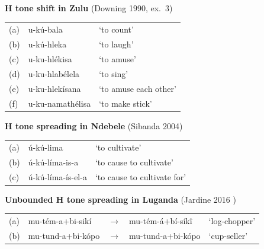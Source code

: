 \ex \textbf{H tone shift in Zulu} (Downing 1990, ex.~3)

\begin{tabular}{@{}lll@{}}
(a) & u-kú-bala            & `to count' \\
(b) & u-kú-hleka           & `to laugh' \\
(c) & u-ku-hlékisa         & `to amuse' \\
(d) & u-ku-hlabélela       & `to sing' \\
(e) & u-ku-hlekísana       & `to amuse each other' \\
(f) & u-ku-namathélisa     & `to make stick' \\[0.4em]
\end{tabular}
\xe

\ex \textbf{H tone spreading in Ndebele} (Sibanda 2004)

\begin{tabular}{@{}lll@{}}
	(a) & ú-kú-lima	& `to cultivate'	\\
	(b) & ú-kú-líma-is-a	           & `to cause to cultivate' \\
	(c) & ú-kú-líma-ís-el-a	           & `to cause to cultivate for' \\
\end{tabular}
\xe
 
\ex \textbf{Unbounded H tone spreading in Luganda} (Jardine 2016 )

\begin{tabular}{@{}lllll@{}}
	(a) & mu-tém-a+bi-sikí	&$\rightarrow$& mu-tém-á+bí-síkî \todo{why the F} & `log-chopper'	\\
	(b) & mu-tund-a+bi-kópo	&$\rightarrow$& mu-tund-a+bi-kópo	           & `cup-seller' \\

\end{tabular}
\xe


